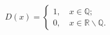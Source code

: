 \documentclass[preview]{standalone}
\begin{document}
\begin{align*}
D(x)=\begin{cases} 1, \quad x \in \mathbb{Q}; \\0, \quad x \in  \mathbb{R} \backslash \mathbb{Q}. \end{cases}
\end{align*}
\end{document}

